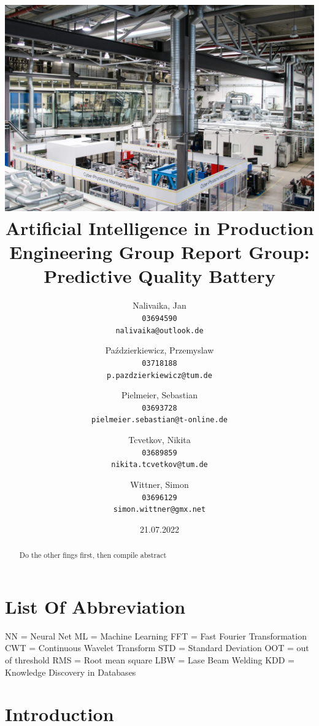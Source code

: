 \documentclass[12pt]{report}
\title{\vspace*{-5cm}\includegraphics[width=15cm]{../img/deckblatt.jpg}\\Artificial Intelligence in Production Engineering \linebreak \linebreak Group Report \linebreak Group: Predictive Quality Battery}
\author{Nalivaika, Jan\\
	\texttt{03694590}\\
	\texttt{nalivaika@outlook.de}
	\and
	Paździerkiewicz, Przemyslaw\\
	\texttt{03718188}\\
	\texttt{p.pazdzierkiewicz@tum.de}
	\and
	Pielmeier, Sebastian\\
	\texttt{03693728}\\
	\texttt{pielmeier.sebastian@t-online.de}
	\and
	Tcvetkov, Nikita\\
	\texttt{03689859}\\
	\texttt{nikita.tcvetkov@tum.de}
	\and
	Wittner, Simon\\
	\texttt{03696129}\\
	\texttt{simon.wittner@gmx.net}
}
\date{21.07.2022}
\begin{document}
\maketitle
\begin{abstract}
	Do the other fings first, then compile abstract
\end{abstract}

\tableofcontents
\chapter*{List Of Abbreviation}
NN = Neural Net \newline
ML = Machine Learning \newline
FFT = Fast Fourier Transformation\newline
CWT = Continuous Wavelet Transform\newline
STD = Standard Deviation \newline
OOT = out of threshold\newline
RMS = Root mean square\newline
LBW = Lase Beam Welding\newline
KDD = Knowledge Discovery in Databases\newline

\listoffigures

\chapter{Introduction}
\end{document}
